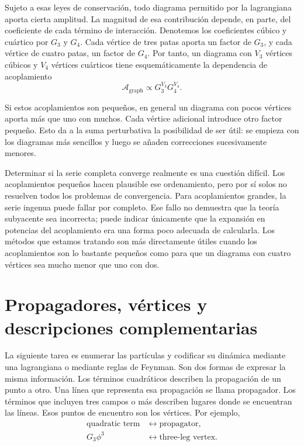 Sujeto a esas leyes de conservación, todo diagrama permitido por la lagrangiana aporta cierta amplitud. La magnitud de esa contribución depende, en parte, del coeficiente de cada término de interacción. Denotemos los coeficientes cúbico y cuártico por \(G_3\) y \(G_4\). Cada vértice de tres patas aporta un factor de \(G_3\), y cada vértice de cuatro patas, un factor de \(G_4\). Por tanto, un diagrama con \(V_3\) vértices cúbicos y \(V_4\) vértices cuárticos tiene esquemáticamente la dependencia de acoplamiento
\begin{equation}
\mathcal{A}_{\mathrm{graph}}
\propto G_3^{V_3}G_4^{V_4}.
\end{equation}

Si estos acoplamientos son pequeños, en general un diagrama con pocos vértices aporta más que uno con muchos. Cada vértice adicional introduce otro factor pequeño. Esto da a la suma perturbativa la posibilidad de ser útil: se empieza con los diagramas más sencillos y luego se añaden correcciones sucesivamente menores.

Determinar si la serie completa converge realmente es una cuestión difícil. Los acoplamientos pequeños hacen plausible ese ordenamiento, pero por sí solos no resuelven todos los problemas de convergencia. Para acoplamientos grandes, la serie ingenua puede fallar por completo. Ese fallo no demuestra que la teoría subyacente sea incorrecta; puede indicar únicamente que la expansión en potencias del acoplamiento era una forma poco adecuada de calcularla. Los métodos que estamos tratando son más directamente útiles cuando los acoplamientos son lo bastante pequeños como para que un diagrama con cuatro vértices sea mucho menor que uno con dos.

\begin{classroomqa}\end{classroomqa}

\section{Propagadores, vértices y descripciones complementarias}

La siguiente tarea es enumerar las partículas y codificar su dinámica mediante una lagrangiana o mediante reglas de Feynman. Son dos formas de expresar la misma información. Los términos cuadráticos describen la propagación de un punto a otro. Una línea que representa esa propagación se llama propagador. Los términos que incluyen tres campos o más describen lugares donde se encuentran las líneas. Esos puntos de encuentro son los vértices. Por ejemplo,
\begin{equation}
\begin{aligned}
\text{quadratic term}
&\longleftrightarrow \text{propagator},\\
G_3\phi^3
&\longleftrightarrow \text{three-leg vertex}.
\end{aligned}
\end{equation}

